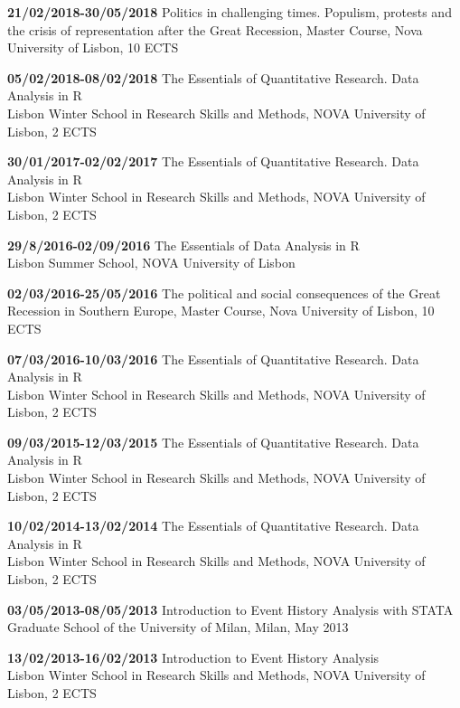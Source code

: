 \documentclass[11pt,]{article}
\renewenvironment{itemize}{
  \begin{list}{}{
    \setlength{\leftmargin}{1.5em}
  }
}{
  \end{list}
}
\begin{document}
\begin{itemize}
\item
  \textbf{21/02/2018-30/05/2018} Politics in challenging times.
  Populism, protests and the crisis of representation after the Great
  Recession, Master Course, Nova University of Lisbon, 10 ECTS
\item
  \textbf{05/02/2018-08/02/2018} The Essentials of Quantitative
  Research. Data Analysis in R\\
  Lisbon Winter School in Research Skills and Methods, NOVA University
  of Lisbon, 2 ECTS
\item
  \textbf{30/01/2017-02/02/2017} The Essentials of Quantitative
  Research. Data Analysis in R\\
  Lisbon Winter School in Research Skills and Methods, NOVA University
  of Lisbon, 2 ECTS
\item
  \textbf{29/8/2016-02/09/2016} The Essentials of Data Analysis in R\\
  Lisbon Summer School, NOVA University of Lisbon
\item
  \textbf{02/03/2016-25/05/2016} The political and social consequences
  of the Great Recession in Southern Europe, Master Course, Nova
  University of Lisbon, 10 ECTS
\item
  \textbf{07/03/2016-10/03/2016} The Essentials of Quantitative
  Research. Data Analysis in R\\
  Lisbon Winter School in Research Skills and Methods, NOVA University
  of Lisbon, 2 ECTS
\item
  \textbf{09/03/2015-12/03/2015} The Essentials of Quantitative
  Research. Data Analysis in R\\
  Lisbon Winter School in Research Skills and Methods, NOVA University
  of Lisbon, 2 ECTS
\item
  \textbf{10/02/2014-13/02/2014} The Essentials of Quantitative
  Research. Data Analysis in R\\
  Lisbon Winter School in Research Skills and Methods, NOVA University
  of Lisbon, 2 ECTS
\item
  \textbf{03/05/2013-08/05/2013} Introduction to Event History Analysis
  with STATA\\
  Graduate School of the University of Milan, Milan, May 2013
\item
  \textbf{13/02/2013-16/02/2013} Introduction to Event History
  Analysis\\
  Lisbon Winter School in Research Skills and Methods, NOVA University
  of Lisbon, 2 ECTS
\item

\end{itemize}
\end{document}
